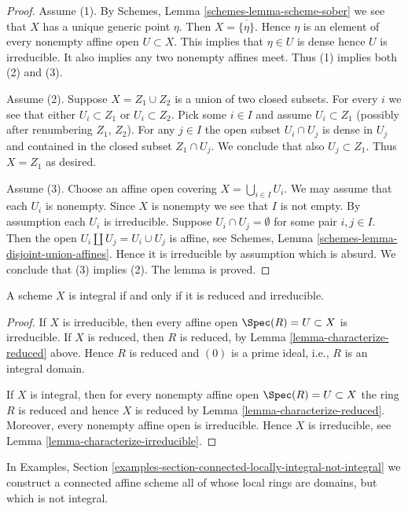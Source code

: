 \begin{proof}
Assume (1). By Schemes, Lemma \ref{schemes-lemma-scheme-sober}
we see that $X$ has a unique generic point $\eta$. Then
$X = \overline{\{\eta\}}$. Hence $\eta$ is an element of
every nonempty affine open $U \subset X$. This implies
that $\eta \in U$ is dense hence $U$ is irreducible.
It also implies any two nonempty affines meet.
Thus (1) implies both (2) and (3).

\medskip\noindent
Assume (2). Suppose $X = Z_1 \cup Z_2$ is a union of two closed subsets.
For every $i$ we see that either $U_i \subset Z_1$ or $U_i \subset Z_2$.
Pick some $i \in I$ and assume $U_i \subset Z_1$ (possibly after renumbering
$Z_1$, $Z_2$). For any $j \in I$ the open subset $U_i \cap U_j$ is dense in
$U_j$ and contained in the closed subset $Z_1 \cap U_j$. We conclude that
also $U_j \subset Z_1$. Thus $X = Z_1$ as desired.

\medskip\noindent
Assume (3). Choose an affine open covering $X = \bigcup_{i \in I} U_i$.
We may assume that each $U_i$ is nonempty.
Since $X$ is nonempty we see that $I$ is not empty.
By assumption each $U_i$ is irreducible.
Suppose $U_i \cap U_j = \emptyset$ for some pair $i, j \in I$.
Then the open $U_i \amalg  U_j = U_i \cup U_j$ is affine, see
Schemes, Lemma \ref{schemes-lemma-disjoint-union-affines}.
Hence it is irreducible by assumption which is absurd. We conclude that (3)
implies (2). The lemma is proved.
\end{proof}

\begin{lemma}
\label{lemma-characterize-integral}
A scheme $X$ is integral if and only if it is reduced and irreducible.
\end{lemma}

\begin{proof}
If $X$ is irreducible, then every affine open $\Spec(R) = U \subset X$
is irreducible. If $X$ is reduced, then $R$ is reduced, by
Lemma \ref{lemma-characterize-reduced} above. Hence $R$ is reduced
and $(0)$ is a prime ideal, i.e., $R$ is an integral domain.

\medskip\noindent
If $X$ is integral, then for every nonempty affine open
$\Spec(R) = U \subset X$ the ring $R$ is reduced
and hence $X$ is reduced by Lemma \ref{lemma-characterize-reduced}.
Moreover, every nonempty affine open is irreducible.
Hence $X$ is irreducible, see Lemma \ref{lemma-characterize-irreducible}.
\end{proof}

\noindent
In Examples, Section
\ref{examples-section-connected-locally-integral-not-integral}
we construct a connected affine scheme all of whose local rings are domains,
but which is not integral.











